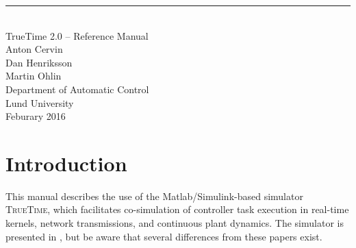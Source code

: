 \documentclass[final,twoside]{rapport}
\begin{document}
\begin{titlepage}
\def\docnumber#1{\large
  ISSN 0280--5316\\
  ISRN LUTFD2/TFRT-{\hskip0.1em}-#1-{\hskip0.1em}-SE}
\def\title{\hspace{1ex}\\[0pt plus 0.3fill]\Huge}
\def\author{\\[0pt plus 0.2fill]\Large}
\def\bottom{\\[0pt plus 0.5fill]\large}
\begin{flushright}
\hrule height 0pt
\title
  {\sc TrueTime} 2.0 -- Reference Manual
\author
  Anton Cervin \\ Dan Henriksson \\ Martin Ohlin
\bottom
  Department of Automatic Control\\
  Lund University\\
  Feburary 2016
\end {flushright}
\end{titlepage}

\setcounter{page}{2}

\thispagestyle{empty}%
\cleardoublepage

\tableofcontents
\normalsize


 


\section{Introduction}
This manual describes the use of the Matlab/Simulink-based
\cite{simulink} simulator \textsc{TrueTime}, which facilitates
co-simulation of controller task execution in real-time kernels,
network transmissions, and continuous plant dynamics. The simulator is
presented in \cite{hen+03, cer+03, hen+02ifac, and+05}, but be aware
that several differences from these papers exist.
\end{document}
